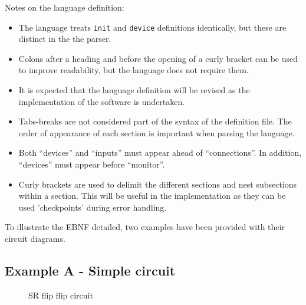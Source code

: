 \documentclass[12pt]{article}
\begin{document}
Notes on the language definition:
\begin{itemize}
\item The language treats \texttt{init} and \texttt{device} definitions identically, but these are distinct in the the parser. 
\item Colons after a heading and before the opening of a curly bracket can be used to improve readability, but the language does not require them. 
\item It is expected that the language definition will be revised as the implementation of the software is undertaken.  
\item Tabs-breaks are not considered part of the syntax of the definition file. The order of appearance of each section is important when parsing the language.
\item  Both “devices” and “inputs” must appear ahead of “connections”. In addition, “devices” must appear before “monitor”.
\item Curly brackets {} are used to delimit the different sections and nest subsections within a section. This will be useful in the implementation as they can be used 'checkpoints' during error handling.  

\end{itemize}

To illustrate the EBNF detailed, two examples have been provided with their circuit diagrams. 

\subsection{Example A - Simple circuit}

\begin{figure} [ht]
\begin{center}
\caption{SR flip flip circuit}
\label{fig1:SR flip flip circuit}
\end{center}
\end{figure}
\end{document}
